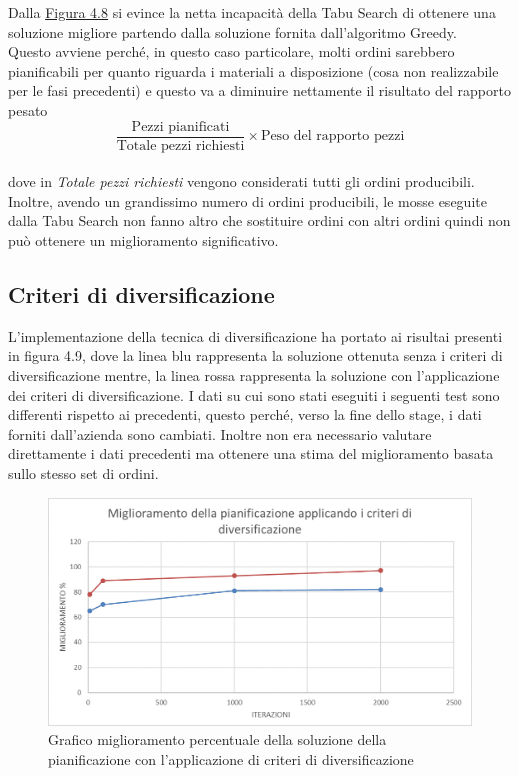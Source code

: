 Dalla \hyperref[4.8]{Figura 4.8} si evince la netta incapacità della Tabu Search di ottenere una soluzione migliore partendo dalla soluzione fornita dall'algoritmo Greedy.\\
Questo avviene perché, in questo caso particolare, molti ordini sarebbero pianificabili per quanto riguarda i materiali a disposizione (cosa non realizzabile per le fasi
precedenti) e questo va a diminuire nettamente il risultato del rapporto pesato \[\frac{\text{Pezzi pianificati}}{\text{Totale pezzi richiesti}} \times \text{Peso del rapporto pezzi}\]\\
dove in \textit{Totale pezzi richiesti} vengono considerati tutti gli ordini producibili.\\ Inoltre, avendo un grandissimo numero di ordini producibili, le mosse eseguite 
dalla Tabu Search non fanno altro che sostituire ordini con altri ordini quindi non può ottenere un miglioramento significativo.

\newpage
\subsection{Criteri di diversificazione}

L'implementazione della tecnica di diversificazione ha portato ai risultai presenti in figura 4.9, dove la linea blu rappresenta la soluzione ottenuta senza i criteri di diversificazione
mentre, la linea rossa rappresenta la soluzione con l'applicazione dei criteri di diversificazione. I dati su cui sono stati eseguiti i seguenti test sono differenti rispetto ai
precedenti, questo perché, verso la fine dello stage, i dati forniti dall'azienda sono cambiati. Inoltre non era necessario valutare direttamente i dati precedenti ma ottenere
una stima del miglioramento basata sullo stesso set di ordini.

\begin{figure}[H]
	\includegraphics[width=13cm]{immagini/diversificazione.png}
	\centering
    \caption{Grafico miglioramento percentuale della soluzione della pianificazione con l'applicazione di criteri di diversificazione}
    \label{4.9}
\end{figure}

